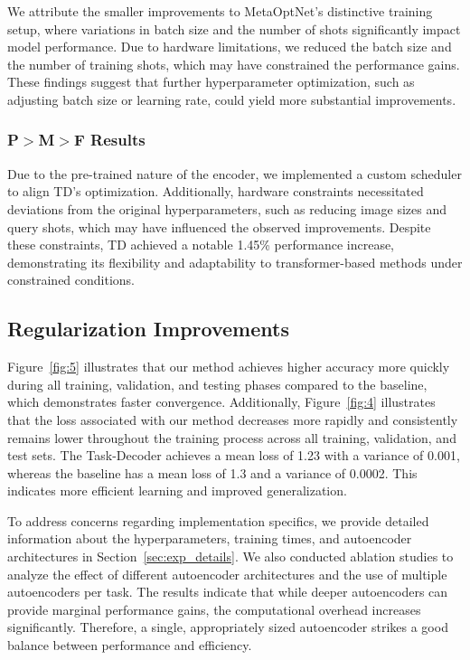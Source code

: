 We attribute the smaller improvements to MetaOptNet's distinctive training setup, where variations in batch size and the number of shots significantly impact model performance. Due to hardware limitations, we reduced the batch size and the number of training shots, which may have constrained the performance gains. These findings suggest that further hyperparameter optimization, such as adjusting batch size or learning rate, could yield more substantial improvements.

{\color{black} \subsubsection*{P$>$M$>$F Results}
Due to the pre-trained nature of the encoder, we implemented a custom scheduler to align TD's optimization. Additionally, hardware constraints necessitated deviations from the original hyperparameters, such as reducing image sizes and query shots, which may have influenced the observed improvements. Despite these constraints, TD achieved a notable 1.45\% performance increase, demonstrating its flexibility and adaptability to transformer-based methods under constrained conditions.}

\subsection{Regularization Improvements}
Figure~\ref{fig:5} illustrates that our method achieves higher accuracy more quickly during all training, validation, and testing phases compared to the baseline, which demonstrates faster convergence. Additionally, Figure~\ref{fig:4} illustrates that the loss associated with our method decreases more rapidly and consistently remains lower throughout the training process across all training, validation, and test sets. The Task-Decoder achieves a mean loss of 1.23 with a variance of 0.001, whereas the baseline has a mean loss of 1.3 and a variance of 0.0002. This indicates more efficient learning and improved generalization.

To address concerns regarding implementation specifics, we provide detailed information about the hyperparameters, training times, and autoencoder architectures in Section~\ref{sec:exp_details}. We also conducted ablation studies to analyze the effect of different autoencoder architectures and the use of multiple autoencoders per task. The results indicate that while deeper autoencoders can provide marginal performance gains, the computational overhead increases significantly. Therefore, a single, appropriately sized autoencoder strikes a good balance between performance and efficiency.


